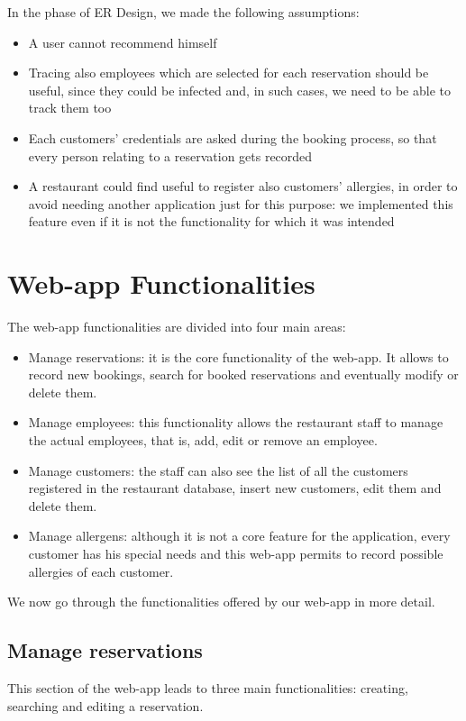 \documentclass{article}
\begin{document}
\vspace{5mm}
In the phase of ER Design, we made the following assumptions:
\begin{itemize}
  \item A user cannot recommend himself
  \item Tracing also employees which are selected for each reservation should be useful, since they could be infected and, in such cases, we need to be able to track them too
  \item Each customers' credentials are asked during the booking process, so that every person relating to a reservation gets recorded
  \item A restaurant could find useful to register also customers' allergies, 
  in order to avoid needing another application just for this purpose: we implemented this feature even if it is not the functionality for which it was intended
\end{itemize}

\newpage

\section*{Web-app Functionalities}
The web-app functionalities are divided into four main areas:
\begin{itemize}
    \item Manage reservations: it is the core functionality of the web-app. It allows
      to record new bookings, search for booked reservations and eventually 
       modify or delete them.
    \item Manage employees: this functionality allows the restaurant staff to manage the actual employees, that is, add, edit or remove an employee.
    \item Manage customers: the staff can also see the list of all the customers registered in the restaurant database, insert new customers, edit them and delete them.
    \item Manage allergens: although it is not a core feature for the application, every customer has his special needs and this web-app permits to record possible allergies of each customer.
\end{itemize}


We now go through the functionalities offered by our web-app in more detail.


\subsection*{Manage reservations}
This section of the web-app leads to three main functionalities: creating, searching
and editing a reservation.
\end{document}

